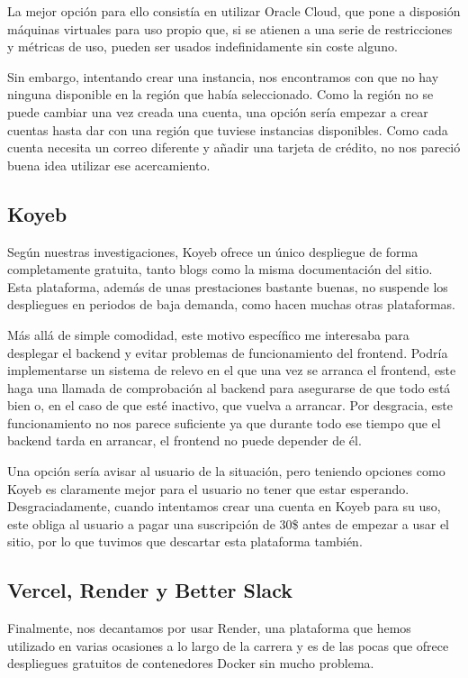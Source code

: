 La mejor opción para ello consistía en utilizar Oracle Cloud, que pone a disposión máquinas virtuales para uso propio que, si se atienen a una serie de restricciones y métricas de uso, pueden ser usados indefinidamente sin coste alguno.

Sin embargo, intentando crear una instancia, nos encontramos con que no hay ninguna disponible en la región que había seleccionado. Como la región no se puede cambiar una vez creada una cuenta, una opción sería empezar a crear cuentas hasta dar con una región que tuviese instancias disponibles. Como cada cuenta necesita un correo diferente y añadir una tarjeta de crédito, no nos pareció buena idea utilizar ese acercamiento.

\subsection{Koyeb}

Según nuestras investigaciones, Koyeb ofrece un único despliegue de forma completamente gratuita, tanto blogs como la misma documentación del sitio. Esta plataforma, además de unas prestaciones bastante buenas, no suspende los despliegues en periodos de baja demanda, como hacen muchas otras plataformas.

Más allá de simple comodidad, este motivo específico me interesaba para desplegar el backend y evitar problemas de funcionamiento del frontend. Podría implementarse un sistema de relevo en el que una vez se arranca el frontend, este haga una llamada de comprobación al backend para asegurarse de que todo está bien o, en el caso de que esté inactivo, que vuelva a arrancar. Por desgracia, este funcionamiento no nos parece suficiente ya que durante todo ese tiempo que el backend tarda en arrancar, el frontend no puede depender de él.

Una opción sería avisar al usuario de la situación, pero teniendo opciones como Koyeb es claramente mejor para el usuario no tener que estar esperando. Desgraciadamente, cuando intentamos crear una cuenta en Koyeb para su uso, este obliga al usuario a pagar una suscripción de 30\$ antes de empezar a usar el sitio, por lo que tuvimos que descartar esta plataforma también.

\subsection{Vercel, Render y Better Slack}

Finalmente, nos decantamos por usar Render, una plataforma que hemos utilizado en varias ocasiones a lo largo de la carrera y es de las pocas que ofrece despliegues gratuitos de contenedores Docker sin mucho problema.

